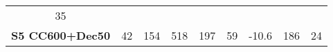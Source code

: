 \begin{longtable}[]{@{}crrrrrrrr@{}}
\begin{minipage}[t]{0.13\columnwidth}
35\strut
\end{minipage}\tabularnewline
\begin{minipage}[t]{0.10\columnwidth}\centering\strut
\textbf{S5 CC600+Dec50}\strut
\end{minipage} & \begin{minipage}[t]{0.09\columnwidth}\raggedleft\strut
42\strut
\end{minipage} & \begin{minipage}[t]{0.06\columnwidth}\raggedleft\strut
154\strut
\end{minipage} & \begin{minipage}[t]{0.06\columnwidth}\raggedleft\strut
518\strut
\end{minipage} & \begin{minipage}[t]{0.07\columnwidth}\raggedleft\strut
197\strut
\end{minipage} & \begin{minipage}[t]{0.07\columnwidth}\raggedleft\strut
59\strut
\end{minipage} & \begin{minipage}[t]{0.04\columnwidth}\raggedleft\strut
-10.6\strut
\end{minipage} & \begin{minipage}[t]{0.13\columnwidth}\raggedleft\strut
186\strut
\end{minipage} & \begin{minipage}[t]{0.13\columnwidth}\raggedleft\strut
24\strut
\end{minipage}\tabularnewline
\bottomrule
\end{longtable}